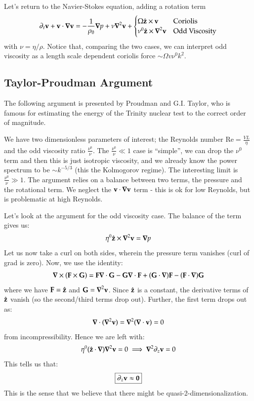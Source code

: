 Let's return to the Navier-Stokes equation, adding a rotation term
\begin{equation}
    \p_t \v{v} + \v{v} \cdot \nabla \v{v} = -\frac{1}{\rho_0}\nabla p + \nu\nabla^2\v{v} + \begin{cases}
        \Omega \hat{\v{z}} \times \v{v} & \text{Coriolis} \\ \nu^0 \hat{\v{z}} \times \nabla^2 \v{v} & \text{Odd Viscosity}
    \end{cases}
\end{equation}
with $\nu = \eta/\rho$. Notice that, comparing the two cases, we can interpret odd viscosity as a length scale dependent coriolis force $\sim \Omega v \nu^0 k^2$.

\subsection{Taylor-Proudman Argument}
The following argument is presented by Proudman and G.I. Taylor, who is famous for estimating the energy of the Trinity nuclear test to the correct order of magnitude. 

We have two dimensionless parameters of interest; the Reynolds number $\text{Re} = \frac{VL}{\eta}$ and the odd viscosity ratio $\frac{\nu^0}{\nu}$. The $\frac{\nu^0}{\nu} \ll 1$ case is ``simple'', we can drop the $\nu^0$ term and then this is just isotropic viscosity, and we already know the power spectrum to be $\sim k^{-5/3}$ (this the Kolmogorov regime). The interesting limit is $\frac{\nu^0}{\nu} \gg 1$. The argument relies on a balance between two terms, the pressure and the rotational term. We neglect the $\v{v} \cdot \nabla \v{v}$ term - this is ok for low Reynolds, but is problematic at high Reynolds.

Let's look at the argument for the odd viscosity case. The balance of the term gives us:
\begin{equation}
    \eta^0 \hat{\v{z}} \times \nabla^2\v{v} = \nabla p
\end{equation}
Let us now take a curl on both sides, wherein the pressure term vanishes (curl of grad is zero). Now, we use the identity:
\begin{equation}
    \nabla \times (\v{F} \times \v{G}) = \v{F}\nabla \cdot \v{G} - \v{G}\nabla \cdot \v{F} + (\v{G} \cdot \nabla)\v{F} - (\v{F}\cdot\nabla)\v{G}
\end{equation}
where we have $\mathbf{F} = \hat{\mathbf{z}}$ and $\v{G} = \nabla^2\v{v}$. Since $\hat{\mathbf{z}}$ is a constant, the derivative terms of $\hat{\mathbf{z}}$ vanish (so the second/third terms drop out). Further, the first term drops out as:
\begin{equation}
    \nabla \cdot (\nabla^2\v{v}) = \nabla^2(\nabla \cdot \v{v}) = 0
\end{equation}
from incompressibility. Hence we are left with:
\begin{equation}
    \eta^0(\zhat \cdot \nabla)\nabla^2\v{v} = 0 \implies  \nabla^2\p_z\v{v} = 0
\end{equation}
This tells us that:
\begin{equation}
    \boxed{\partial_z \mathbf{v} \approx \mathbf{0}}
\end{equation}
This is the sense that we believe that there might be quasi-2-dimensionalization.

